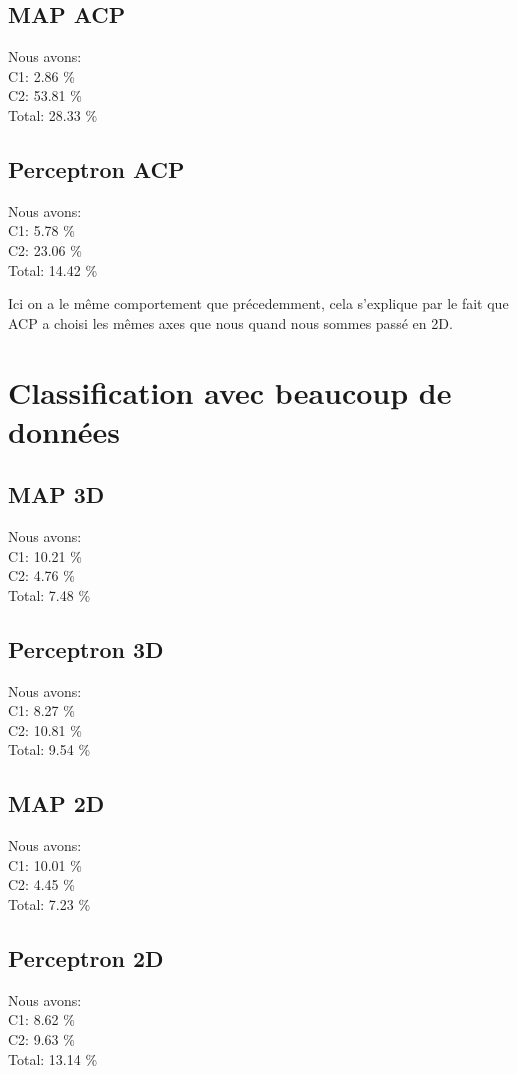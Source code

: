 \documentclass[10pt]{article}
\begin{document}
\subsection{MAP ACP}
Nous avons:\\
C1: 2.86 \% \\
C2: 53.81 \%\\
Total: 28.33 \%
\subsection{Perceptron ACP}
Nous avons:\\
C1: 5.78 \% \\
C2: 23.06 \%\\
Total: 14.42 \%

Ici on a le même comportement que précedemment,
cela s'explique par le fait que ACP a choisi les mêmes axes que nous
quand nous sommes passé en 2D.

\section{Classification avec beaucoup de données}

\subsection{MAP 3D}
Nous avons:\\
C1: 10.21 \% \\
C2: 4.76 \%\\
Total: 7.48 \%
\subsection{Perceptron 3D}
Nous avons:\\
C1: 8.27 \% \\
C2: 10.81 \%\\
Total: 9.54 \%

\subsection{MAP 2D}
Nous avons:\\
C1: 10.01 \% \\
C2: 4.45 \%\\
Total: 7.23 \%
\subsection{Perceptron 2D}
Nous avons:\\
C1: 8.62 \% \\
C2: 9.63 \%\\
Total: 13.14 \%
\end{document}

